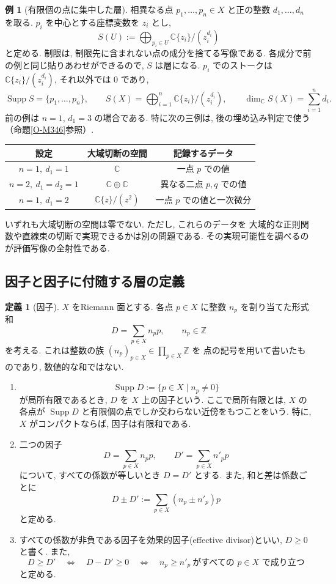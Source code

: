 \documentclass[dvipdfmx,a4paper,11pt]{article} %
\newcommand{\Z}{\mathbb{Z}}
\newcommand{\C}{\mathbb{C}}
\theoremstyle{definition}
\numberwithin{equation}{section}
\newtheorem{dfn}[thm]{定義}
\newtheorem{exa}[thm]{例}
\begin{document}
\begin{exa}[有限個の点に集中した層]\label{O-M187}
相異なる点 $p_1,\ldots,p_n\in X$ と正の整数 $d_1,\ldots,d_n$ を取る.
$p_i$ を中心とする座標変数を $z_i$ とし,
\[
S(U):=\bigoplus_{p_i\in U}\C\{z_i\}/(z_i^{d_i})
\]
と定める. 制限は, 制限先に含まれない点の成分を捨てる写像である.
各成分で前の例と同じ貼りあわせができるので, $S$ は層になる.
$p_i$ でのストークは $\C\{z_i\}/(z_i^{d_i})$, それ以外では $0$ であり,
\[
\operatorname{Supp}S=\{p_1,\ldots,p_n\},\qquad
S(X)=\bigoplus_{i=1}^n\C\{z_i\}/(z_i^{d_i}),\qquad
\dim_\C S(X)=\sum_{i=1}^n d_i.
\]
前の例は $n=1$, $d_1=3$ の場合である.
特に次の三例は, 後の埋め込み判定で使う（命題\ref{O-M346}参照）.
\begin{center}
\begin{tabular}{c|c|c}
設定 & 大域切断の空間 & 記録するデータ\\\hline
$n=1,\ d_1=1$ & $\C$ & 一点 $p$ での値\\
$n=2,\ d_1=d_2=1$ & $\C\oplus\C$ & 異なる二点 $p,q$ での値\\
$n=1,\ d_1=2$ & $\C\{z\}/(z^2)$ & 一点 $p$ での値と一次微分
\end{tabular}
\end{center}
いずれも大域切断の空間は零でない. ただし, これらのデータを
大域的な正則関数や直線束の切断で実現できるかは別の問題である.
その実現可能性を調べるのが評価写像の全射性である.
\end{exa}

\subsection{因子と因子に付随する層の定義}\label{O-S034}


\begin{dfn}[因子]\label{O-M194}
$X$ をRiemann 面とする.
各点 $p\in X$ に整数 $n_p$ を割り当てた形式和
\[
D=\sum_{p\in X}n_p p,\qquad n_p\in\Z
\]
を考える.
これは整数の族 $(n_p)_{p\in X}\in\prod_{p\in X}\Z$ を
点の記号を用いて書いたものであり, 数値的な和ではない.

\begin{enumerate}
\item

\[
\operatorname{Supp}D:=\{p\in X\mid n_p\neq0\}
\]
が局所有限であるとき, $D$ を $X$ 上の因子という.
ここで局所有限とは, $X$ の各点が
$\operatorname{Supp}D$ と有限個の点でしか交わらない近傍をもつことをいう.
特に, $X$ がコンパクトならば, 因子は有限和である.

\item

二つの因子
\[
D=\sum_{p\in X}n_p p,\qquad
D'=\sum_{p\in X}n'_p p
\]
について, すべての係数が等しいとき $D=D'$ とする.
また, 和と差は係数ごとに
\[
D\pm D':=\sum_{p\in X}(n_p\pm n'_p)p
\]
と定める.

\item

すべての係数が非負である因子を効果的因子(effective divisor)といい, 
$D\geq0$ と書く.
また, 
\[
D\geq D'
\quad\Longleftrightarrow\quad
D-D'\geq0
\quad\Longleftrightarrow\quad
n_p\geq n'_p\ \text{がすべての }p\in X\text{ で成り立つ}
\]
と定める.
\end{enumerate}
\end{dfn}
\end{document}
